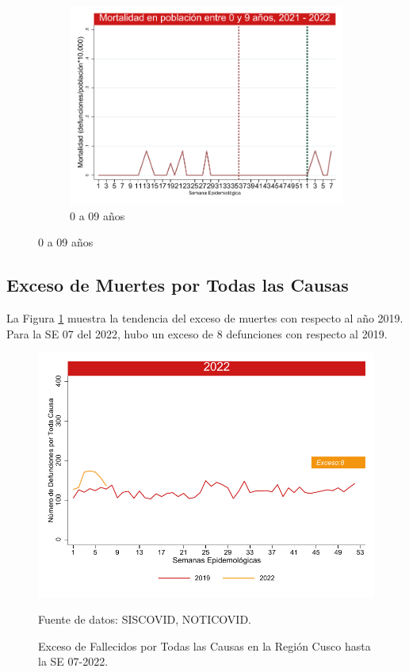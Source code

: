 \documentclass[12pt,a4paper,openany]{book}
\begin{document}
\begin{figure}[h]
	\vspace{10mm}
	\begin{subfigure}[b]{0.45\textwidth}
		\centering
		\includegraphics[width=\textwidth]{../figuras/mortalidad_edad_0.pdf}
		\caption{0 a 09 años}
	\end{subfigure}
\end{figure}
\clearpage	
	\subsection*{Exceso de Muertes por Todas las Causas}
\noindent La Figura \ref{fig:exceso_regional} muestra la tendencia del exceso de muertes con respecto al año 2019. Para la SE 07 del 2022, hubo un exceso de 8 defunciones con respecto al 2019. 

	\begin{figure}[h]
	\caption{Exceso de Fallecidos por Todas las Causas en la Región Cusco hasta la SE 07-2022.}\label{fig:exceso_regional}
	\begin{center}
		\includegraphics[width=0.85\linewidth]{../figuras/exceso_region_2022.pdf}
	\end{center}
	{\footnotesize {Fuente de datos: SISCOVID, NOTICOVID.}}
	\end{figure}
\clearpage
\end{document}
